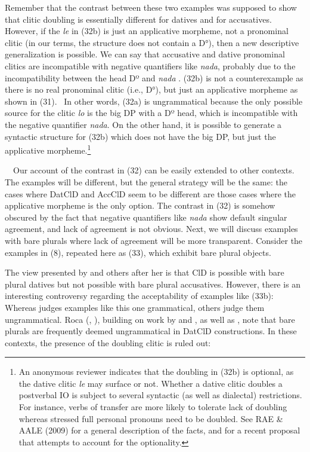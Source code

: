 \documentclass[output=paper,colorlinks,citecolor=brown,
]{langscibook}
\begin{document}
Remember that the contrast between these two examples was supposed to show that clitic doubling is essentially different for datives and for accusatives. However, if the \textit{le} in (32b) is just an applicative morpheme, not a pronominal clitic (in our terms, the structure does not contain a D°), then a new descriptive generalization is possible. We can say that accusative and dative pronominal clitics are incompatible with negative quantifiers like \textit{nada}, probably due to the incompatibility between the head Dº and \textit{nada} \citep{leonetti2008}. (32b) is not a counterexample as there is no real pronominal clitic (i.e., D°), but just an applicative morpheme as shown in (31). \ In other words, (32a) is ungrammatical because the only possible source for the clitic \textit{lo} is the big DP with a Dº head, which is incompatible with the negative quantifier \textit{nada}. On the other hand, it is possible to generate a syntactic structure for (32b) which does not have the big DP, but just the applicative morpheme.\footnote{\textrm{ An anonymous reviewer indicates that the doubling in (32b) is optional, as the dative clitic }\textrm{\textit{le }}\textrm{may surface or not. Whether a dative clitic doubles a postverbal IO is subject to several syntactic (as well as dialectal) restrictions. For instance, verbs of transfer are more likely to tolerate lack of doubling whereas stressed full personal pronouns need to be doubled. See RAE \& AALE (2009) for a general description of the facts, and \citet{pineda2020} for a recent proposal that attempts to account for the optionality.}} 

\ \ Our account of the contrast in (32) can be easily extended to other contexts. The examples will be different, but the general strategy will be the same: the cases where DatClD and AccClD seem to be different are those cases where the applicative morpheme is the only option. The contrast in (32) is somehow obscured by the fact that negative quantifiers like \textit{nada} show default singular agreement, and lack of agreement is not obvious. Next, we will discuss examples with bare plurals where lack of agreement will be more transparent. Consider the examples in (8), repeated here as (33), which exhibit bare plural objects. 




The view presented by \citet{suñer1988} and others after her is that ClD is possible with bare plural datives but not possible with bare plural accusatives. However, there is an interesting controversy regarding the acceptability of examples like (33b): Whereas \citet{suñer1988} judges examples like this one grammatical, others judge them ungrammatical. Roca (\citeyear{roca1992}, \citeyear{roca1996}), building on work by \citet{jaeggli1982} and \citet{fernandez1989reccion}, as well as \citet{laca1999}, note that bare plurals are frequently deemed ungrammatical in DatClD constructions. In these contexts, the presence of the doubling clitic is ruled out:
\end{document}
